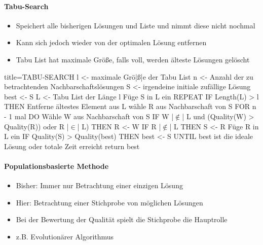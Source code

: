 \documentclass[
    ngerman,
    color=3b,
    load_common, %
    summary,
    boxarc,
]{rubos-tuda-template}
\begin{document}
\paragraph{Tabu-Search}\mbox{}
\begin{idea}\mbox{}
    \begin{itemize}
        \item Speichert alle bisherigen Lösungen und Liste und nimmt diese nicht nochmal
        \item Kann sich jedoch wieder von der optimalen Lösung entfernen
        \item Tabu List hat maximale Grö\ss e, falls voll, werden älteste Lösungen gelöscht
    \end{itemize}
\end{idea}
\begin{codeBlock}[autogobble,escapeinside=||,fontsize=\footnotesize]{title={TABU-SEARCH}}
    l <- maximale Grö|\ss{}|e der Tabu List
    n <- Anzahl der zu betrachtenden Nachbarschaftslösungen
    S <- irgendeine initiale zufällige Lösung
    best <- S
    L <- { } Tabu List der Länge l
    Füge S in L ein
    REPEAT
        IF Length(L) > l THEN
            Entferne ältestes Element aus L
        wähle R aus Nachbarschaft von S
        FOR n - 1 mal DO
            Wähle W aus Nachbarschaft von S
            IF W |$\notin$| L und (Quality(W) > Quality(R)) oder R |$\in$| L) THEN
                R <- W
        IF R |$\notin$| L THEN
            S <- R
            Füge R in L ein
        IF Quality(S) > Quality(best) THEN
            best <- S
    UNTIL best ist die ideale Lösung oder totale Zeit erreicht
    return best
\end{codeBlock}


\clearpage

\paragraph{Populationsbasierte Methode}
\begin{itemize}
    \item Bisher: Immer nur Betrachtung einer einzigen Lösung
    \item Hier: Betrachtung einer Stichprobe von möglichen Lösungen
    \item Bei der Bewertung der Qualität spielt die Stichprobe die Hauptrolle
    \item z.B. Evolutionärer Algorithmus
\end{itemize}
\end{document}
